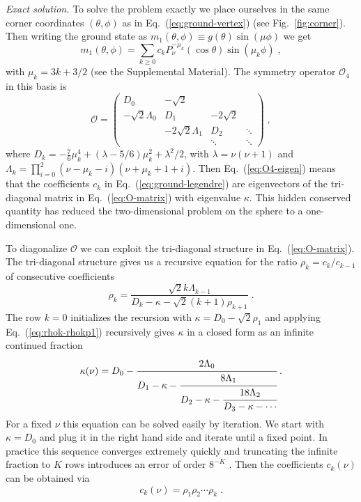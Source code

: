 \documentclass[aps,prl,twocolumn,superscriptaddress,floatfix,nofootinbib]{revtex4-2}
\begin{document}
\emph{Exact solution.} To solve the problem exactly we place ourselves in the same corner coordinates $(\theta, \phi)$ as in Eq.~(\ref{eq:ground-vertex}) (see Fig.~\ref{fig:corner}). Then writing the ground state as $m_1(\theta, \phi) \equiv g(\theta) \sin(\mu \phi)$ we get 
\begin{equation} \label{eq:ground-legendre}
    m_1(\theta, \phi) = \sum_{k \geq 0} c_k P_\nu^{-\mu_k}(\cos \theta) \sin(\mu_k \phi) \;,
\end{equation}
with $\mu_k = 3k + 3/2$ (see the Supplemental Material). The symmetry operator $\mathcal{O}_4$ in this basis is 
\begin{equation} \label{eq:O-matrix}
    \mathcal{O} = \begin{pmatrix}
        D_0 & -\sqrt{2} & & \\
        -\sqrt{2} \Lambda_0 & D_1 & -2 \sqrt{2} & \\
         & -2 \sqrt{2}\Lambda_1 & D_2 & \ddots \\
         & & \ddots & \ddots 
    \end{pmatrix} \;,
\end{equation}
where $D_k = -\frac{7}{6}\mu_k^4 + (\lambda - 5/6)\mu_k^2 + \lambda^2/2$, with $\lambda = \nu(\nu + 1)$ and $\Lambda_k = \prod_{i = 0}^{2} (\nu - \mu_k - i)(\nu + \mu_k + 1 + i)$. Then Eq.~(\ref{eq:O4-eigen}) means that the coefficients $c_k$ in Eq.~(\ref{eq:ground-legendre}) are eigenvectors of the tri-diagonal matrix in Eq.~(\ref{eq:O-matrix}) with eigenvalue $\kappa$. This hidden conserved quantity has reduced the two-dimensional problem on the sphere to a one-dimensional one. 

To diagonalize $\mathcal{O}$ we can exploit the tri-diagonal structure in Eq.~(\ref{eq:O-matrix}). The tri-diagonal structure gives us a recursive equation for the ratio $\rho_k = c_k / c_{k-1}$ of consecutive coefficients
\begin{equation} \label{eq:rhok-rhokp1}
    \rho_k = \frac{\sqrt{2} k \Lambda_{k - 1}}{D_k - \kappa - \sqrt{2}(k + 1) \rho_{k + 1}} \;.
\end{equation}
The row $k = 0$ initializes the recursion with $\kappa = D_0 - \sqrt{2} \rho_1$ and applying Eq.~(\ref{eq:rhok-rhokp1}) recursively gives $\kappa$ in a closed form as an infinite continued fraction
\begin{equation}\label{eq:kappa}
    \kappa(\nu) = D_0 - \cfrac{2 \Lambda_0}{D_1 - \kappa - \cfrac{8 \Lambda_1}{D_2 - \kappa - \cfrac{18 \Lambda_2}{D_3 - \kappa - \cdots}}} \;.
\end{equation}
For a fixed $\nu$ this equation can be solved easily by iteration. We start with $\kappa = D_0$ and plug it in the right hand side and iterate until a fixed point. In practice this sequence converges extremely quickly and truncating the infinite fraction to $K$ rows introduces an error of order $8^{-K}$ \cite{SM}. Then the coefficients $c_k(\nu)$ can be obtained via
\begin{equation} \label{eq:ck}
    c_k(\nu) = \rho_1 \rho_2 \cdots \rho_k \;.
\end{equation}
\end{document}
